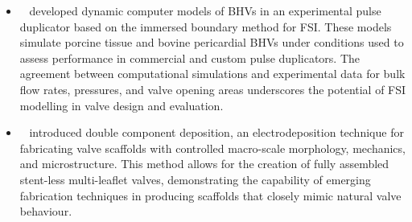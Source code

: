 
\begin{itemize}
    \item  ~
          developed dynamic computer models of \gls{BHV}s in an experimental pulse duplicator based on the immersed boundary method for \gls{FSI}. These models simulate porcine tissue and bovine pericardial BHVs under conditions used to assess performance in commercial and custom pulse duplicators. The agreement between computational simulations and experimental data for bulk flow rates, pressures, and valve opening areas underscores the potential of \gls{FSI} modelling in valve design and evaluation.
    \item  ~ introduced double component deposition, an electrodeposition technique for fabricating valve scaffolds with controlled macro-scale morphology, mechanics, and microstructure. This method allows for the creation of fully assembled stent-less multi-leaflet valves, demonstrating the capability of emerging fabrication techniques in producing scaffolds that closely mimic natural valve behaviour.

\end{itemize}
